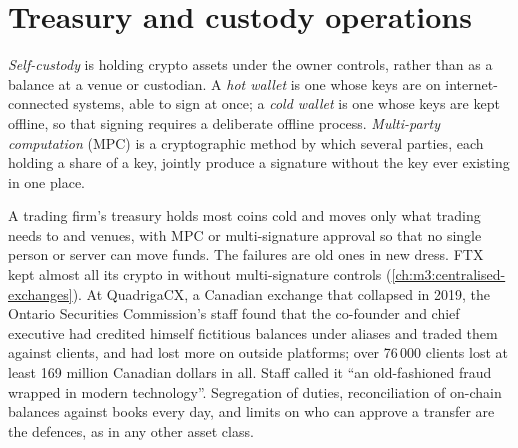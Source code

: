 \section{Treasury and custody operations}

\begin{definition}\label{def:m3:the-crypto-trading-business:custody}
\emph{Self-custody} is holding crypto assets under  the owner controls, rather than as a balance at a venue or custodian. A
\emph{hot wallet} is one whose keys are on internet-connected systems, able to sign at once; a \emph{cold wallet} is one
whose keys are kept offline, so that signing requires a deliberate offline process. \emph{Multi-party computation} (MPC) is a
cryptographic method by which several parties, each holding a share of a key, jointly produce a signature without the key ever existing in one place.
\end{definition}

A trading firm's treasury holds most coins cold and moves only what trading needs to  and venues, with MPC or multi-signature approval so that no
single person or server can move funds. The failures are old ones in new dress. FTX kept almost all its crypto in  without multi-signature controls
(\cref{ch:m3:centralised-exchanges}). At QuadrigaCX, a Canadian exchange that collapsed in 2019, the Ontario Securities Commission's staff found that the
co-founder and chief executive had credited himself fictitious balances under aliases and traded them against clients, and had lost more on outside
platforms; over 76\,000 clients lost at least 169 million Canadian dollars in all. Staff called it ``an old-fashioned fraud wrapped in modern
technology''. Segregation of duties, reconciliation of on-chain balances against books every day, and limits on who can approve a transfer are the defences, as
in any other asset class.

